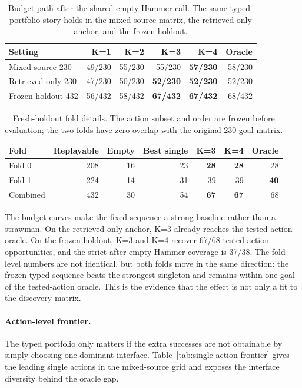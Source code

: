 \documentclass{article}
\newcommand{\best}[1]{\textbf{\textcolor{aceTeal}{#1}}}
\begin{document}
\begin{table}[H]
\caption{Budget path after the shared empty-Hammer call. The same typed-portfolio story holds in the mixed-source matrix, the retrieved-only anchor, and the frozen holdout.}
\label{tab:budget-path}
\centering
\small
\begin{tabular}{lrrrrr}
\toprule
Setting & K=1 & K=2 & K=3 & K=4 & Oracle \\
\midrule
Mixed-source 230 & 49/230 & 55/230 & 55/230 & \best{57/230} & 58/230 \\
Retrieved-only 230 & 47/230 & 50/230 & \best{52/230} & \best{52/230} & 52/230 \\
\rowcolor{aceTealLight}
Frozen holdout 432 & 56/432 & 58/432 & \best{67/432} & \best{67/432} & 68/432 \\
\bottomrule
\end{tabular}
\end{table}

\begin{table}[H]
\caption{Fresh-holdout fold details. The action subset and order are frozen before evaluation; the two folds have zero overlap with the original 230-goal matrix.}
\label{tab:fresh-folds}
\centering
\small
\begin{tabular}{lrrrrrr}
\toprule
Fold & Replayable & Empty & Best single & K=3 & K=4 & Oracle \\
\midrule
Fold 0 & 208 & 16 & 23 & \best{28} & \best{28} & 28 \\
Fold 1 & 224 & 14 & 31 & 39 & 39 & \best{40} \\
\rowcolor{aceTealLight}
Combined & 432 & 30 & 54 & \best{67} & \best{67} & 68 \\
\bottomrule
\end{tabular}
\end{table}

The budget curves make the fixed sequence a strong baseline rather than a strawman. On the retrieved-only anchor, K=3 already reaches the tested-action oracle. On the frozen holdout, K=3 and K=4 recover 67/68 tested-action opportunities, and the strict after-empty-Hammer coverage is 37/38. The fold-level numbers are not identical, but both folds move in the same direction: the frozen typed sequence beats the strongest singleton and remains within one goal of the tested-action oracle. This is the evidence that the effect is not only a fit to the discovery matrix.

\paragraph{Action-level frontier.}
The typed portfolio only matters if the extra successes are not obtainable by simply choosing one dominant interface. Table~\ref{tab:single-action-frontier} gives the leading single actions in the mixed-source grid and exposes the interface diversity behind the oracle gap.
\end{document}
